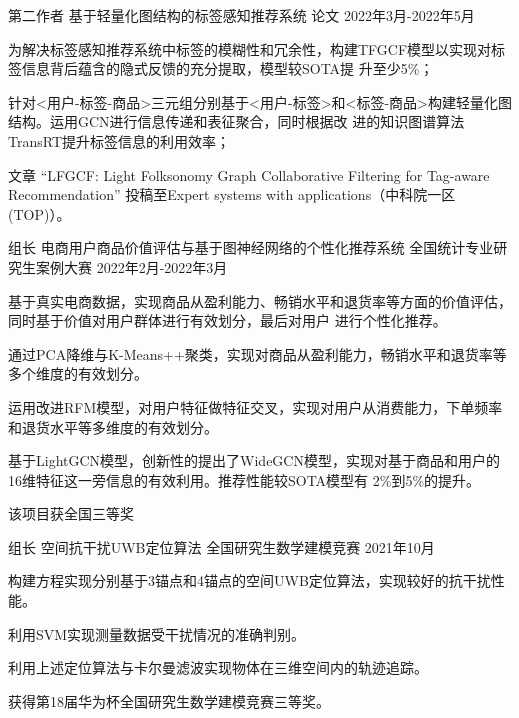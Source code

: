 \begin{cventries}
\cventry
{第二作者} %
{基于轻量化图结构的标签感知推荐系统} %
{论文} %
{2022年3月-2022年5月} %
{
  \begin{cvitems} %
    \item {为解决标签感知推荐系统中标签的模糊性和冗余性，构建TFGCF模型以实现对标签信息背后蕴含的隐式反馈的充分提取，模型较SOTA提 升至少5\%；}
    \item {针对<用户-标签-商品>三元组分别基于<用户-标签>和<标签-商品>构建轻量化图结构。运用GCN进行信息传递和表征聚合，同时根据改 进的知识图谱算法TransRT提升标签信息的利用效率；}
    \item {文章 “LFGCF: Light Folksonomy Graph Collaborative Filtering for Tag-aware Recommendation” 投稿至Expert systems 
    with applications（中科院一区(TOP)）。}
  \end{cvitems}
}

\cventry
{组长} %
{电商用户商品价值评估与基于图神经网络的个性化推荐系统} %
{全国统计专业研究生案例大赛} %
{2022年2月-2022年3月} %
{
  \begin{cvitems} %
    \item {基于真实电商数据，实现商品从盈利能力、畅销水平和退货率等方面的价值评估，同时基于价值对用户群体进行有效划分，最后对用户
    进行个性化推荐。}
    \item {通过PCA降维与K-Means++聚类，实现对商品从盈利能力，畅销水平和退货率等多个维度的有效划分。}
    \item {运用改进RFM模型，对用户特征做特征交叉，实现对用户从消费能力，下单频率和退货水平等多维度的有效划分。}
    \item {基于LightGCN模型，创新性的提出了WideGCN模型，实现对基于商品和用户的16维特征这一旁信息的有效利用。推荐性能较SOTA模型有
    2\%到5\%的提升。}
    \item {该项目获全国三等奖}
  \end{cvitems}
}

\cventry
{组长} %
{空间抗干扰UWB定位算法} %
{全国研究生数学建模竞赛} %
{2021年10月} %
{
  \begin{cvitems} %
    \item {构建方程实现分别基于3锚点和4锚点的空间UWB定位算法，实现较好的抗干扰性能。}
    \item {利用SVM实现测量数据受干扰情况的准确判别。}
    \item {利用上述定位算法与卡尔曼滤波实现物体在三维空间内的轨迹追踪。}
    \item {获得第18届华为杯全国研究生数学建模竞赛三等奖。}
  \end{cvitems}
}

\end{cventries}
